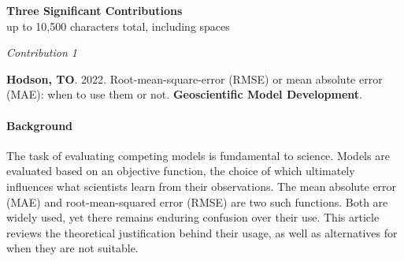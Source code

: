 \documentclass[12pt]{article}
\begin{document}
\begin{comment}

LaTeX code for contributions subheadings:

\raggedright Background--
\vspace{10pt}

*** YOUR BACKGROUND TEXT HERE ***

\vspace{10pt}
\raggedright Role--
\vspace{10pt}

*** YOUR ROLE TEXT HERE ***

\vspace{10pt}
\raggedright Results--
\vspace{10pt}

*** YOUR RESULTS TEXT HERE ***

\vspace{10pt}
\raggedright Impact--
\vspace{10pt}

*** YOUR IMPACT TEXT HERE ***

\end{comment}

\vspace{10pt}
\centering \textbf{Three Significant Contributions} \\
\centering up to 10,500 characters total, including spaces \\


\vspace{10pt}
\raggedright \textit{Contribution 1} \\
\vspace{10pt}


\textbf{Hodson, TO}. 2022.
Root-mean-square-error (RMSE) or mean absolute error (MAE):
when to use them or not.
\textbf{Geoscientific Model Development}. %

\paragraph{Background}
The task of evaluating competing models is fundamental to science.
Models are evaluated based on an objective function,
the choice of which ultimately influences what scientists learn from their observations.
The mean absolute error (MAE) and root-mean-squared error (RMSE) are two such functions.
Both are widely used, yet there remains enduring confusion over their use. 
This article reviews the theoretical justification behind their usage,
as well as alternatives for when they are not suitable.
\end{document}
